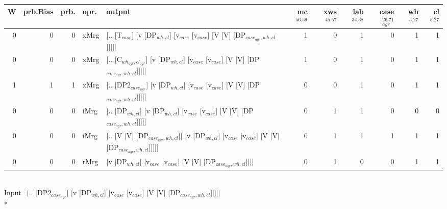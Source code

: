 \begin{tabularx}{\linewidth}{rrrlXrrrrrr}
\hline
   W &   prb.Bias &   prb. & opr.   & output                                                                                        &   mc$^{56.59}$ &   xws$^{45.57}$ &   lab$^{34.38}$ &   case$_{agr}^{26.71}$ &   wh$^{5.27}$ &   cl$^{5.27}$ \\
\hline
   0 &       0 &   0 & xMrg & [.. [T$_{case}$] [v [DP$_{wh,cl}$] [v$_{case}$ [v$_{case}$] [V [V] [DP$_{case_{agr},wh,cl}$]]]]]                    &            1 &             0 &             1 &                  0 &           1 &           1 \\
   0 &       0 &   0 & xMrg & [.. [C$_{wh_{agr},cl_{agr}}$] [v [DP$_{wh,cl}$] [v$_{case}$ [v$_{case}$] [V [V] [DP$_{case_{agr},wh,cl}$]]]]]           &            1 &             0 &             1 &                  0 &           1 &           1 \\
   1 &       1 &   1 & xMrg & [.. [DP2$_{case_{agr}}$] [v [DP$_{wh,cl}$] [v$_{case}$ [v$_{case}$] [V [V] [DP$_{case_{agr},wh,cl}$]]]]]              &            0 &             0 &             1 &                  0 &           1 &           1 \\
   0 &       0 &   0 & iMrg & [.. [DP$_{wh,cl}$] [v [DP$_{wh,cl}$] [v$_{case}$ [v$_{case}$] [V [V] [DP$_{case_{agr},wh,cl}$]]]]]                  &            0 &             1 &             1 &                  0 &           0 &           0 \\
   0 &       0 &   0 & iMrg & [.. [V [V] [DP$_{case_{agr},wh,cl}$]] [v [DP$_{wh,cl}$] [v$_{case}$ [v$_{case}$] [V [V] [DP$_{case_{agr},wh,cl}$]]]]] &            0 &             1 &             1 &                  1 &           1 &           1 \\
   0 &       0 &   0 & rMrg & [v [DP$_{wh,cl}$] [v$_{case}$ [v$_{case}$] [V [V] [DP$_{case_{agr},wh,cl}$]]]]                                  &            0 &             1 &             0 &                  0 &           1 &           1 \\
\hline
\end{tabularx}\endgroup\\
\begingroup\scriptsize Input=[.. [DP2$_{case_{agr}}$] [v [DP$_{wh,cl}$] [v$_{case}$ [v$_{case}$] [V [V] [DP$_{case_{agr},wh,cl}$]]]]]\\*
